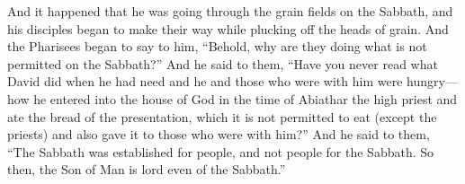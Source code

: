 \begin{biblechapter}
 And it happened that he was going through the grain fields on the Sabbath, and his disciples began to make their way while plucking off the heads of grain.
\verse And the Pharisees began to say to him, “Behold, why are they doing what is not permitted on the Sabbath?”
\verse And he said to them, “Have you never read what David did when he had need and he and those who were with him were hungry—
\verse how he entered into the house of God in the time of Abiathar the high priest and ate the bread of the presentation, which it is not permitted to eat (except the priests) and also gave it to those who were with him?”
\verse And he said to them, “The Sabbath was established for people, and not people for the Sabbath.
\verse So then, the Son of Man is lord even of the Sabbath.”
\end{biblechapter}

